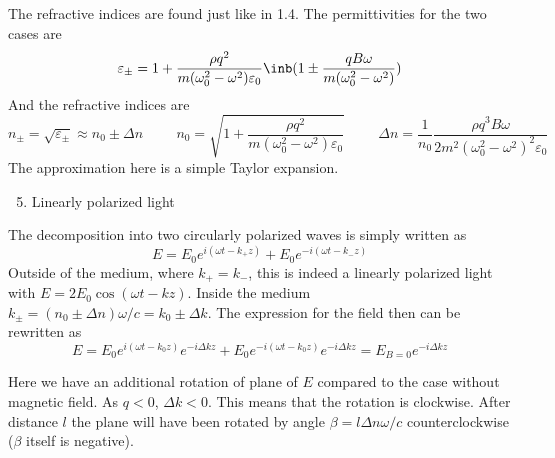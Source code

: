 \begin{enumerate}
\hspace{.5cm}
The refractive indices are found just like in 1.4.
The permittivities for the two cases are
\begin{equation}
    \varepsilon_{\pm} = 1+
    \frac{\rho q^2}{m (\omega_0^2 - \omega^2) \varepsilon_0}
    \inb({1 \pm \frac{qB\omega}{m (\omega_0^2 - \omega^2)} })
\end{equation}
And the refractive indices are
\begin{equation}
    n_{\pm} = \sqrt{\varepsilon_{\pm}} \approx n_0 \pm \Delta n
    \hspace{1cm}
    n_0 = \sqrt{1 + \frac{\rho q^2}{m (\omega_0^2 - \omega^2) \varepsilon_0}}
    \hspace{1cm}
    \Delta n = \frac{1}{n_0} \frac{\rho q^3 B\omega}{2 m^2 (\omega_0^2 - \omega^2)^2 \varepsilon_0}
\end{equation}
The approximation here is a simple Taylor expansion.

\begin{enumerate}
    \setcounter{enumii}{4}
    \item Linearly polarized light
\end{enumerate}

\hspace{.5cm}
The decomposition into two circularly polarized waves is simply written as
\begin{equation}
    E = E_0 e^{i (\omega t - k_+ z)} + E_0 e^{-i (\omega t - k_- z)}
\end{equation}
Outside of the medium, where $k_+ = k_-$,
this is indeed a linearly polarized light with $E = 2E_0 \cos(\omega t - k z)$.
Inside the medium $k_{\pm} = (n_0 \pm \Delta n) \omega / c = k_0 \pm \Delta k$.
The expression for the field then can be rewritten as
\begin{equation}
    E = E_0 e^{i (\omega t - k_0 z)} e^{-i \Delta k z} +
        E_0 e^{-i (\omega t - k_0 z)} e^{-i \Delta k z} 
    = E_{B=0} e^{-i \Delta k z}
\end{equation}

\hspace{.5cm}
Here we have an additional rotation of plane of $E$
compared to the case without magnetic field.
As $q < 0$, $\Delta k < 0$.
This means that the rotation is clockwise.
After distance $l$ the plane will have been rotated by angle
$\beta = l \Delta n \omega / c$ counterclockwise
($\beta$ itself is negative).

\end{enumerate}